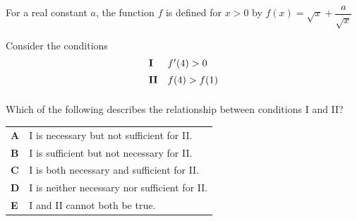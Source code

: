 \documentclass[11pt,a4paper]{article}
\begin{document}
\begin{enumerate}[label=\textbf{\arabic*.},leftmargin=*,itemsep=0pt,start=20]
\questionitem[Logic]
For a real constant $a$, the function $f$ is defined for $x>0$ by $f(x)=\sqrt{x}+\dfrac{a}{\sqrt{x}}$

Consider the conditions
\[
\begin{array}{@{}ll@{}}
\textbf{I} & f'(4)>0 \\[5pt]
\textbf{II} & f(4)>f(1) \\[5pt]
\end{array}
\]

Which of the following describes the relationship between conditions I and II?

\par\vspace*{12pt}
\begin{tabularx}{\linewidth}{@{}>{\bfseries}l Y@{}}
A &
I is necessary but not sufficient for II.
\\[0.8em]
B &
I is sufficient but not necessary for II.
\\[0.8em]
C &
I is both necessary and sufficient for II.
\\[0.8em]
D &
I is neither necessary nor sufficient for II.
\\[0.8em]
E &
I and II cannot both be true.
\\
\end{tabularx}
\end{enumerate}
\end{document}
